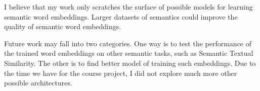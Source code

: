 \documentclass{article}
\begin{document}
I believe that my work only scratches the surface of possible models for learning semantic word embeddings. Larger datasets of semantics could improve the quality of semantic word embeddings.

Future work may fall into two categories. One way is to test the performance of the trained word embeddings on other semantic tasks, such as Semantic Textual Similarity. The other is to find better model of training such embeddings. Due to the time we have for the course project, I did not explore much more other possible architectures.



\end{document}
